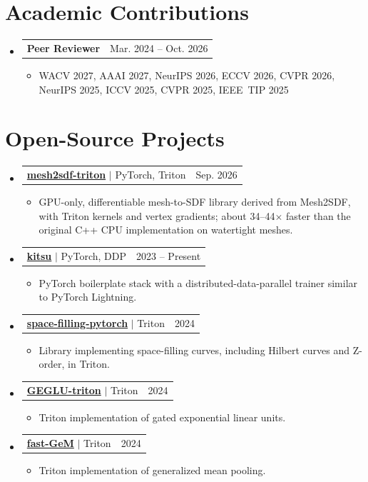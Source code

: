 \documentclass[letterpaper,11pt]{article}
\makeatletter
\newcommand{\resumeItem}[1]{
  \item\small{{#1 \vspace{-2pt}}
  }
}
\newcommand{\resumeProjectHeading}[2]{
    \item
    \begin{tabular*}{0.97\textwidth}{l@{\extracolsep{\fill}}r}
      \small#1 & #2 \\
    \end{tabular*}\vspace{-7pt}
}
\newcommand{\resumeSubHeadingListStart}{\begin{itemize}[leftmargin=0.15in, label={}]}
\newcommand{\resumeSubHeadingListEnd}{\end{itemize}}
\newcommand{\resumeItemListStart}{\begin{itemize}}
\newcommand{\resumeItemListEnd}{\end{itemize}\vspace{-5pt}}
\makeatother
\begin{document}
\section{Academic Contributions}
  \resumeSubHeadingListStart
    \resumeProjectHeading
      {\textbf{Peer Reviewer}}{Mar. 2024 -- Oct. 2026}
      \resumeItemListStart
        \resumeItem{WACV 2027, AAAI 2027, NeurIPS 2026, ECCV 2026, CVPR 2026, NeurIPS 2025, ICCV 2025, CVPR 2025, IEEE~TIP 2025}
      \resumeItemListEnd
  \resumeSubHeadingListEnd

\section{Open-Source Projects}
  \resumeSubHeadingListStart
    \resumeProjectHeading
      {\textbf{\href{https://github.com/Kitsunetic/mesh2sdf-triton}{mesh2sdf-triton}} $|$ PyTorch, Triton}{Sep. 2026}
      \resumeItemListStart
        \resumeItem{GPU-only, differentiable mesh-to-SDF library derived from Mesh2SDF, with Triton kernels and vertex gradients; about 34--44$\times$ faster than the original C++ CPU implementation on watertight meshes.}
      \resumeItemListEnd
    \resumeProjectHeading
      {\textbf{\href{https://github.com/Kitsunetic/kitsu}{kitsu}} $|$ PyTorch, DDP}{2023 -- Present}
      \resumeItemListStart
        \resumeItem{PyTorch boilerplate stack with a distributed-data-parallel trainer similar to PyTorch Lightning.}
      \resumeItemListEnd
    \resumeProjectHeading
      {\textbf{\href{https://github.com/Kitsunetic/space-filling-pytorch}{space-filling-pytorch}} $|$ Triton}{2024}
      \resumeItemListStart
        \resumeItem{Library implementing space-filling curves, including Hilbert curves and Z-order, in Triton.}
      \resumeItemListEnd
    \resumeProjectHeading
      {\textbf{\href{https://github.com/Kitsunetic/GEGLU-triton}{GEGLU-triton}} $|$ Triton}{2024}
      \resumeItemListStart
        \resumeItem{Triton implementation of gated exponential linear units.}
      \resumeItemListEnd
    \resumeProjectHeading
      {\textbf{\href{https://github.com/Kitsunetic/fast-GeM}{fast-GeM}} $|$ Triton}{2024}
      \resumeItemListStart
        \resumeItem{Triton implementation of generalized mean pooling.}
      \resumeItemListEnd
  \resumeSubHeadingListEnd
\end{document}
